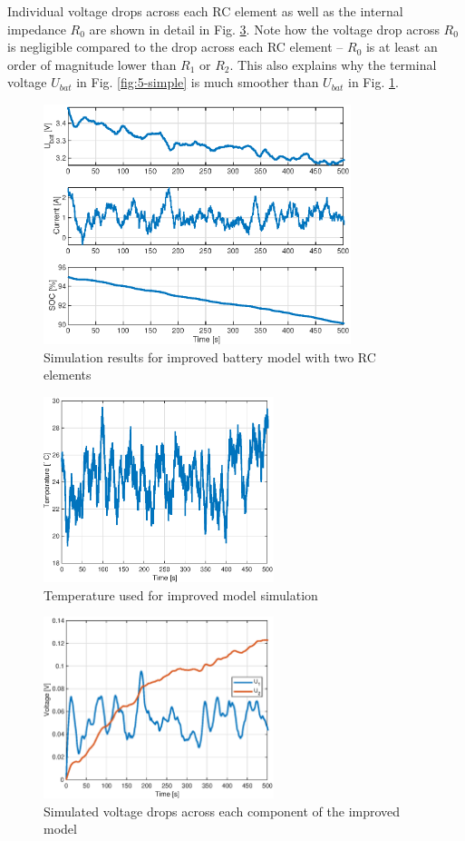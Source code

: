  Individual voltage drops across each RC element as well as the internal impedance $R_0$
 are shown in detail in Fig. \ref{fig:5-complex-RC}. Note how the voltage drop across $R_0$
 is negligible compared to the drop across each RC element -- $R_0$ is at least an order of magnitude lower than $R_1$ or $R_2$. This also explains why the terminal voltage $U_{bat}$ in Fig. \ref{fig:5-simple} is much smoother than $U_{bat}$ in Fig. \ref{fig:5-complex}.
 
\begin{figure}
    \centering
    \includegraphics[width=0.8\textwidth]{figures/5/complex-everything.eps}
    \caption{Simulation results for improved battery model with two RC elements}
    \label{fig:5-complex}
\end{figure}

\begin{figure}
    \centering
    \includegraphics[width=0.6\textwidth]{figures/5/complex-Temp.eps}
    \caption{Temperature used for improved model simulation}
    \label{fig:5-complex-temp}
\end{figure}

\begin{figure}
    \centering
    \includegraphics[width=0.6\textwidth]{figures/5/complex-U-RC.eps}
    \caption{Simulated voltage drops across each component of the improved model}
    \label{fig:5-complex-RC}
\end{figure}


